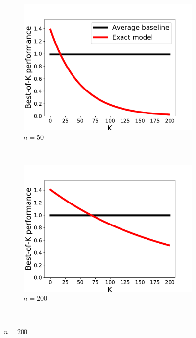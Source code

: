 \documentclass{article}
\begin{document}
\begin{figure}
  \centering
  \begin{subfigure}[b]{0.3\textwidth}
    \includegraphics[width=\textwidth]{images/best_of_k_toy_n50.pdf}
    \caption{$n=50$}
    \label{fig:gull}
  \end{subfigure}
  ~ %
  \begin{subfigure}[b]{0.3\textwidth}
    \includegraphics[width=\textwidth]{images/best_of_k_toy_n200.pdf}
    \caption{$n=200$}
    \label{fig:tiger}
  \end{subfigure}
  ~ %

\end{figure}
\end{document}
